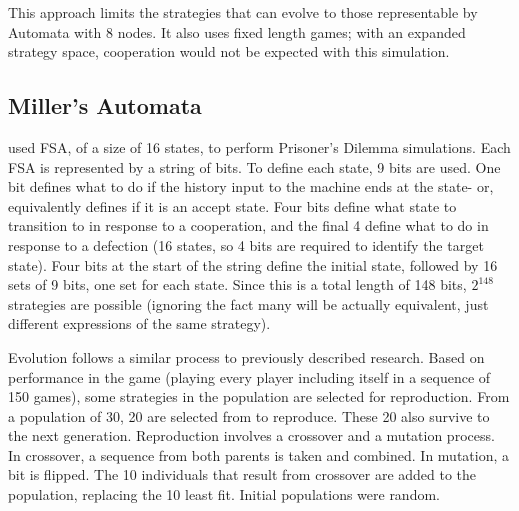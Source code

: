 \documentclass[a4paper,11pt,bcshonoursthesis,singlespace,twoside]{cssethesis}
\begin{document}
This approach limits the strategies that can evolve to those representable by Automata with 8 nodes. 
It also uses fixed length games; with an expanded strategy space, cooperation would not be expected with this simulation.
%
%

\subsection{Miller's Automata}
\citet{miller1996coevolution} used FSA, of a size of 16 states, to perform Prisoner's Dilemma simulations.  
Each FSA is represented by a string of bits. 
To define each state, 9 bits are used. One bit defines what to do if the history input to the machine ends at the state- or, equivalently defines if it is an accept state. Four bits define what state to transition to in response to a cooperation, and the final 4 define what to do in response to a defection (16 states, so 4 bits are required to identify the target state). 
Four bits at the start of the string define the initial state, followed by 16 sets of 9 bits, one set for each state. 
Since this is a total length of 148 bits, $2^{148}$ strategies are possible (ignoring the fact many will be actually equivalent, just different expressions of the same strategy). 

Evolution follows a similar process to previously described research. 
Based on performance in the game (playing every player including itself in a sequence of 150 games), some strategies in the population are selected for reproduction. 
From a population of 30, 20 are selected from to reproduce. 
These 20 also survive to the next generation. 
Reproduction involves a crossover and a mutation process. 
In crossover, a sequence from both parents is taken and combined. 
In mutation, a bit is flipped. 
The 10 individuals that result from crossover are added to the population, replacing the 10 least fit. 
Initial populations were random. 
\end{document}
